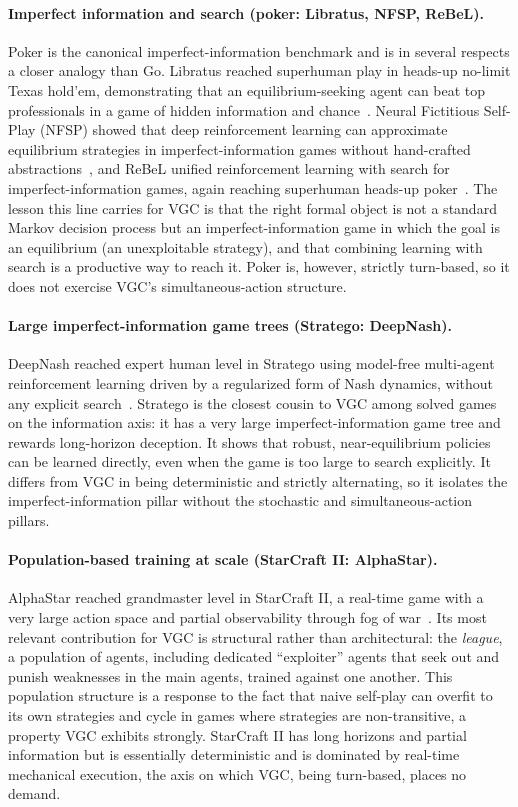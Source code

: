 \paragraph{Imperfect information and search (poker: Libratus, NFSP, ReBeL).}
Poker is the canonical imperfect-information benchmark and is in several respects a
closer analogy than Go. Libratus reached superhuman play in heads-up no-limit
Texas hold'em, demonstrating that an equilibrium-seeking agent can beat top
professionals in a game of hidden information and chance~\cite{brown2017libratus}.
Neural Fictitious Self-Play (NFSP) showed that deep reinforcement learning can
approximate equilibrium strategies in imperfect-information games without
hand-crafted abstractions~\cite{heinrich2016nfsp}, and ReBeL unified
reinforcement learning with search for imperfect-information games, again reaching
superhuman heads-up poker~\cite{brown2020rebel}. The lesson this line carries for
VGC is that the right formal object is not a standard Markov decision process but
an imperfect-information game in which the goal is an equilibrium (an
unexploitable strategy), and that combining learning with search is a productive
way to reach it. Poker is, however, strictly turn-based, so it does not exercise
VGC's simultaneous-action structure.

\paragraph{Large imperfect-information game trees (Stratego: DeepNash).}
DeepNash reached expert human level in Stratego using model-free multi-agent
reinforcement learning driven by a regularized form of Nash dynamics, without any
explicit search~\cite{perolat2022deepnash}. Stratego is the closest cousin to VGC
among solved games on the information axis: it has a very large
imperfect-information game tree and rewards long-horizon deception. It shows that
robust, near-equilibrium policies can be learned directly, even when the game is
too large to search explicitly. It differs from VGC in being deterministic and
strictly alternating, so it isolates the imperfect-information pillar without the
stochastic and simultaneous-action pillars.

\paragraph{Population-based training at scale (StarCraft II: AlphaStar).}
AlphaStar reached grandmaster level in StarCraft II, a real-time game with a
very large action space and partial observability through fog of
war~\cite{vinyals2019alphastar}. Its most relevant contribution for VGC is
structural rather than architectural: the \emph{league}, a population of agents,
including dedicated ``exploiter'' agents that seek out and punish weaknesses in
the main agents, trained against one another. This population structure is a
response to the fact that naive self-play can overfit to its own strategies and
cycle in games where strategies are non-transitive, a property VGC exhibits
strongly. StarCraft II has long horizons and partial information but is essentially
deterministic and is dominated by real-time mechanical execution, the axis on
which VGC, being turn-based, places no demand.

